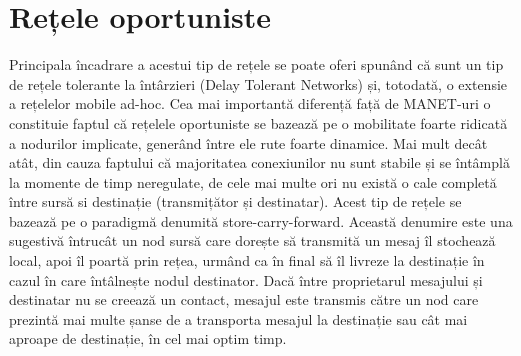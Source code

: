 \documentclass[12pt,a4paper]{report}
\begin{document}
\section{Rețele oportuniste}
Principala încadrare a acestui tip de rețele se poate oferi spunând că sunt un tip de rețele tolerante la întârzieri (Delay Tolerant Networks) și, totodată, o extensie a rețelelor mobile ad-hoc. Cea mai importantă diferență față de MANET-uri o constituie faptul că rețelele oportuniste se bazează pe o mobilitate foarte ridicată a nodurilor implicate, generând între ele rute foarte dinamice. Mai mult decât atât, din cauza faptului că majoritatea conexiunilor nu sunt stabile și se întâmplă la momente de timp neregulate, de cele mai multe ori nu există o cale completă între sursă si destinație (transmițător și destinatar). Acest tip de rețele se bazează pe o paradigmă denumită store-carry-forward. Această denumire este una sugestivă întrucât un nod sursă care dorește să transmită un mesaj îl stochează local, apoi îl poartă prin rețea, urmând ca în final să îl livreze la destinație în cazul în care întâlnește nodul destinator. Dacă între proprietarul mesajului și destinatar nu se creează un contact, mesajul este transmis către un nod care prezintă mai multe șanse de a transporta mesajul la destinație sau cât mai aproape de destinație, în cel mai optim timp.
\end{document}
